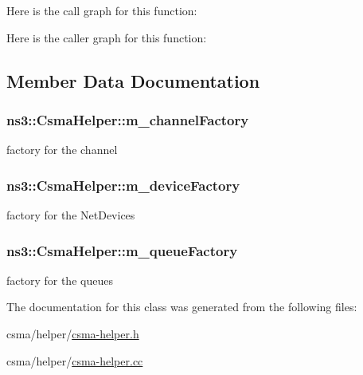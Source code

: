 Here is the call graph for this function\+:




Here is the caller graph for this function\+:




\subsection{Member Data Documentation}
\subsubsection[{\texorpdfstring{m\+\_\+channel\+Factory}{m_channelFactory}}]{ ns3\+::\+Csma\+Helper\+::m\+\_\+channel\+Factory\hspace{0.3cm}{\ttfamily [private]}}\hypertarget{classns3_1_1CsmaHelper_a3c01647f915baaae06d12c5129722ea2}{}\label{classns3_1_1CsmaHelper_a3c01647f915baaae06d12c5129722ea2}


factory for the channel 

\subsubsection[{\texorpdfstring{m\+\_\+device\+Factory}{m_deviceFactory}}]{ ns3\+::\+Csma\+Helper\+::m\+\_\+device\+Factory\hspace{0.3cm}{\ttfamily [private]}}\hypertarget{classns3_1_1CsmaHelper_af5106cade4d5256195c7acdc7e0bb715}{}\label{classns3_1_1CsmaHelper_af5106cade4d5256195c7acdc7e0bb715}


factory for the Net\+Devices 

\subsubsection[{\texorpdfstring{m\+\_\+queue\+Factory}{m_queueFactory}}]{ ns3\+::\+Csma\+Helper\+::m\+\_\+queue\+Factory\hspace{0.3cm}{\ttfamily [private]}}\hypertarget{classns3_1_1CsmaHelper_acd821d4c1457bb3b9e5916fe43d20f4b}{}\label{classns3_1_1CsmaHelper_acd821d4c1457bb3b9e5916fe43d20f4b}


factory for the queues 



The documentation for this class was generated from the following files\+:\begin{DoxyCompactItemize}
\item 
csma/helper/\hyperlink{csma-helper_8h}{csma-\/helper.\+h}\item 
csma/helper/\hyperlink{csma-helper_8cc}{csma-\/helper.\+cc}\end{DoxyCompactItemize}
